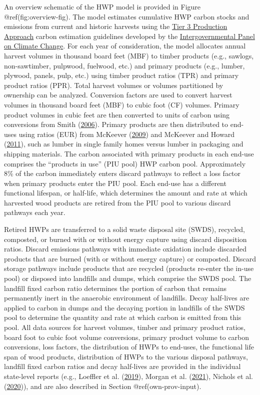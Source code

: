 \documentclass[
  openany]{book}
\begin{document}
An overview schematic of the HWP model is provided in Figure
@ref(fig:overview-fig). The model estimates cumulative HWP carbon stocks
and emissions from current and historic harvests using the
\href{https://www.ipcc-nggip.iges.or.jp/public/2006gl/pdf/4_Volume4/V4_04_Ch4_Forest_Land.pdf}{Tier
3 Production Approach} carbon estimation guidelines developed by the
\href{https://www.ipcc.ch/}{Intergovernmental Panel on Climate Change}.
For each year of consideration, the model allocates annual harvest
volumes in thousand board feet (MBF) to timber products (e.g., sawlogs,
non-sawtimber, pulpwood, fuelwood, etc.) and primary products (e.g.,
lumber, plywood, panels, pulp, etc.) using timber product ratios (TPR)
and primary product ratios (PPR). Total harvest volumes or volumes
partitioned by ownership can be analyzed. Conversion factors are used to
convert harvest volumes in thousand board feet (MBF) to cubic foot (CF)
volumes. Primary product volumes in cubic feet are then converted to
units of carbon using conversions from Smith
(\protect\hyperlink{ref-smith2006}{2006}). Primary products are then
distributed to end-uses using ratios (EUR) from McKeever
(\protect\hyperlink{ref-mckeever2009}{2009}) and McKeever and Howard
(\protect\hyperlink{ref-mckeever2011}{2011}), such as lumber in single
family homes versus lumber in packaging and shipping materials. The
carbon associated with primary products in each end-use comprises the
``products in use'' (PIU pool) HWP carbon pool. Approximately 8\% of the
carbon immediately enters discard pathways to reflect a loss factor when
primary products enter the PIU pool. Each end-use has a different
functional lifespan, or half-life, which determines the amount and rate
at which harvested wood products are retired from the PIU pool to
various discard pathways each year.

Retired HWPs are transferred to a solid waste disposal site (SWDS),
recycled, composted, or burned with or without energy capture using
discard disposition ratios. Discard emissions pathways with immediate
oxidation include discarded products that are burned (with or without
energy capture) or composted. Discard storage pathways include products
that are recycled (products re-enter the in-use pool) or disposed into
landfills and dumps, which comprise the SWDS pool. The landfill fixed
carbon ratio determines the portion of carbon that remains permanently
inert in the anaerobic environment of landfills. Decay half-lives are
applied to carbon in dumps and the decaying portion in landfills of the
SWDS pool to determine the quantity and rate at which carbon is emitted
from this pool. All data sources for harvest volumes, timber and primary
product ratios, board foot to cubic foot volume conversions, primary
product volume to carbon conversions, loss factors, the distribution of
HWPs to end-uses, the functional life span of wood products,
distribution of HWPs to the various disposal pathways, landfill fixed
carbon ratios and decay half-lives are provided in the individual
state-level reports (e.g., Loeffler et al.
(\protect\hyperlink{ref-loeffler2019}{2019}), Morgan et al.
(\protect\hyperlink{ref-morgan2021}{2021}), Nichols et al.
(\protect\hyperlink{ref-nichols2020}{2020})), and are also described in
Section @ref(own-prov-input).
\end{document}
